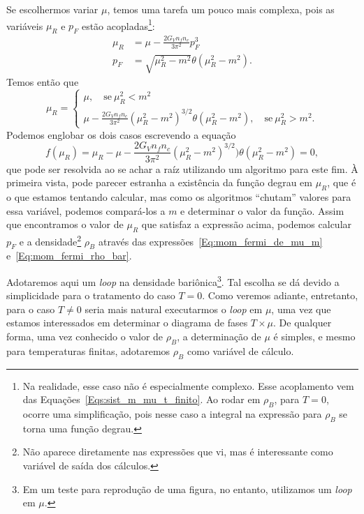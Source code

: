 Se escolhermos variar $\mu$, temos uma tarefa um pouco mais complexa, pois as variáveis $\mu_R$ e $p_F$ estão acopladas\footnote{Na realidade, esse caso não é especialmente complexo. Esse acoplamento vem das Equações~\eqref{Eqs:sist_m_mu_t_finito}. Ao rodar em $\rho_B$, para $T = 0$, ocorre uma simplificação, pois nesse caso a integral na expressão para $\rho_B$ se torna uma função degrau.}:
\begin{align}
	\mu_R &= \mu - \frac{2 G_V n_f n_c}{3\pi^2} p_F^3 \\
	p_F & = \sqrt{\mu_R^2 - m^2} \theta(\mu_R^2 - m^2). \label{Eq:mom_fermi_de_mu_m}
\end{align}
%
Temos então que
\begin{equation}
	\mu_R = \begin{cases} \mu, \quad\textrm{se}~\mu_R^2 < m^2 \\ \mu - \frac{2 G_V n_f n_c}{3\pi^2} (\mu_R^2 - m^2)^{3/2} \theta(\mu_R^2 - m^2), \quad\textrm{se}~\mu_R^2 > m^2.\end{cases}
\end{equation}
%
Podemos englobar os dois casos escrevendo a equação
\begin{equation}
	f(\mu_R) = \mu_R - \mu - \frac{2 G_V n_f n_c}{3\pi^2} (\mu_R^2 - m^2)^{3/2}) \theta(\mu_R^2 - m^2) = 0,
\end{equation}
%
que pode ser resolvida ao se achar a raíz utilizando um algoritmo para este fim. À primeira vista, pode parecer estranha a existência da função degrau em $\mu_R$, que é o que estamos tentando calcular, mas como os algoritmos ``chutam'' valores para essa variável, podemos compará-los a $m$ e determinar o valor da função. Assim que encontramos o valor de $\mu_R$ que satisfaz a expressão acima, podemos calcular $p_F$ e a densidade\footnote{Não aparece diretamente nas expressões que vi, mas é interessante como variável de saída dos cálculos.} $\rho_B$ através das expressões~\eqref{Eq:mom_fermi_de_mu_m} e~\eqref{Eq:mom_fermi_rho_bar}.

Adotaremos aqui um \emph{loop} na densidade bariônica\footnote{Em um teste para reprodução de uma figura, no entanto, utilizamos um \emph{loop} em $\mu$.}. Tal escolha se dá devido a simplicidade para o tratamento do caso $T = 0$. Como veremos adiante, entretanto, para o caso $T \neq 0$ seria mais natural executarmos o \emph{loop} em $\mu$, uma vez que estamos interessados em determinar o diagrama de fases $T \times \mu$. De qualquer forma, uma vez conhecido o valor de $\rho_B$, a determinação de $\mu$ é simples, e mesmo para temperaturas finitas, adotaremos $\rho_B$ como variável de cálculo.

